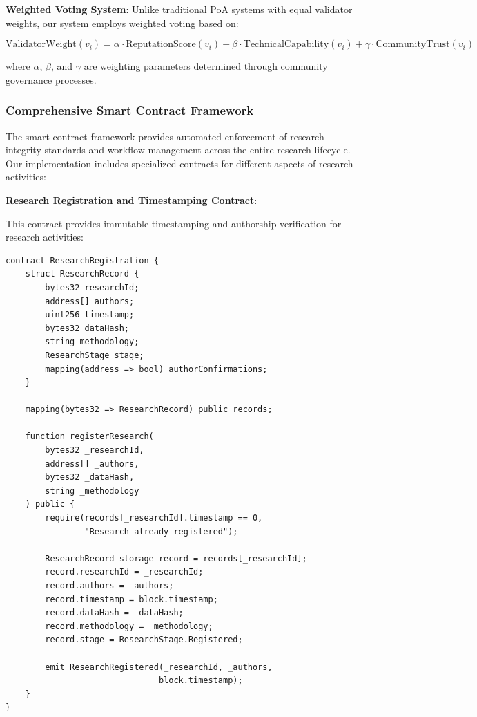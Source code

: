 \documentclass[10pt,twocolumn]{article}
\begin{document}
\textbf{Weighted Voting System}: Unlike traditional PoA systems with equal validator weights, our system employs weighted voting based on:

\begin{equation}
\text{ValidatorWeight}(v_i) = \alpha \cdot \text{ReputationScore}(v_i) + \beta \cdot \text{TechnicalCapability}(v_i) + \gamma \cdot \text{CommunityTrust}(v_i)
\end{equation}

where $\alpha$, $\beta$, and $\gamma$ are weighting parameters determined through community governance processes.

\subsubsection{Comprehensive Smart Contract Framework}

The smart contract framework provides automated enforcement of research integrity standards and workflow management across the entire research lifecycle. Our implementation includes specialized contracts for different aspects of research activities:

\textbf{Research Registration and Timestamping Contract}:

This contract provides immutable timestamping and authorship verification for research activities:

\begin{verbatim}
contract ResearchRegistration {
    struct ResearchRecord {
        bytes32 researchId;
        address[] authors;
        uint256 timestamp;
        bytes32 dataHash;
        string methodology;
        ResearchStage stage;
        mapping(address => bool) authorConfirmations;
    }
    
    mapping(bytes32 => ResearchRecord) public records;
    
    function registerResearch(
        bytes32 _researchId,
        address[] _authors,
        bytes32 _dataHash,
        string _methodology
    ) public {
        require(records[_researchId].timestamp == 0, 
                "Research already registered");
        
        ResearchRecord storage record = records[_researchId];
        record.researchId = _researchId;
        record.authors = _authors;
        record.timestamp = block.timestamp;
        record.dataHash = _dataHash;
        record.methodology = _methodology;
        record.stage = ResearchStage.Registered;
        
        emit ResearchRegistered(_researchId, _authors, 
                               block.timestamp);
    }
}
\end{verbatim}
\end{document}
